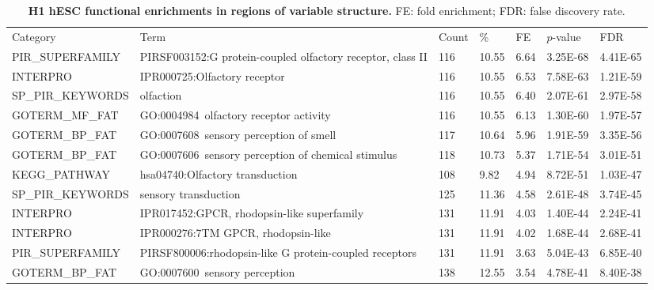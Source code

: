 \documentclass[a4paper,11pt,oneside]{book}
\begin{document}
{\scriptsize 
\begin{longtable}{lllllll}
\caption[H1 hESC functional enrichments in regions of variable structure.]{ {\bf
H1 hESC functional enrichments in regions of variable structure. }
FE: fold enrichment; FDR: false discovery rate.
}\label{tab:h1go}\\
\endfirsthead

Category          & Term
& Count & \%    & FE & $p$-value   & FDR      \\
PIR\_SUPERFAMILY  & PIRSF003152:G protein-coupled olfactory receptor, class II      & 116   & 10.55 & 6.64            & 3.25E-68 & 4.41E-65 \\
INTERPRO          & IPR000725:Olfactory receptor                                    & 116   & 10.55 & 6.53            & 7.58E-63 & 1.21E-59 \\
SP\_PIR\_KEYWORDS & olfaction                                                       & 116   & 10.55 & 6.40            & 2.07E-61 & 2.97E-58 \\
GOTERM\_MF\_FAT   & GO:0004984~olfactory receptor activity                          & 116   & 10.55 & 6.13            & 1.30E-60 & 1.97E-57 \\
GOTERM\_BP\_FAT   & GO:0007608~sensory perception of smell                          & 117   & 10.64 & 5.96            & 1.91E-59 & 3.35E-56 \\
GOTERM\_BP\_FAT   & GO:0007606~sensory perception of chemical stimulus              & 118   & 10.73 & 5.37            & 1.71E-54 & 3.01E-51 \\
KEGG\_PATHWAY     & hsa04740:Olfactory transduction                                 & 108   & 9.82  & 4.94            & 8.72E-51 & 1.03E-47 \\
SP\_PIR\_KEYWORDS & sensory transduction                                            & 125   & 11.36 & 4.58            & 2.61E-48 & 3.74E-45 \\
INTERPRO          & IPR017452:GPCR, rhodopsin-like superfamily                      & 131   & 11.91 & 4.03            & 1.40E-44 & 2.24E-41 \\
INTERPRO          & IPR000276:7TM GPCR, rhodopsin-like                              & 131   & 11.91 & 4.02            & 1.68E-44 & 2.68E-41 \\
PIR\_SUPERFAMILY  & PIRSF800006:rhodopsin-like G protein-coupled receptors          & 131   & 11.91 & 3.63            & 5.04E-43 & 6.85E-40 \\
GOTERM\_BP\_FAT   & GO:0007600~sensory perception                                   & 138   & 12.55 & 3.54            & 4.78E-41 & 8.40E-38 \\

\end{longtable}}
\end{document}
